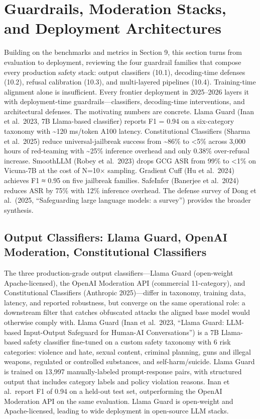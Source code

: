 \documentclass{article}
\begin{document}
\section{Guardrails, Moderation Stacks, and Deployment Architectures}\label{guardrails-moderation-stacks-and-deployment-architectures}

Building on the benchmarks and metrics in Section 9, this section turns from evaluation to deployment, reviewing the four guardrail families that compose every production safety stack: output classifiers (10.1), decoding-time defenses (10.2), refusal calibration (10.3), and multi-layered pipelines (10.4). Training-time alignment alone is insufficient. Every frontier deployment in 2025--2026 layers it with deployment-time guardrails---classifiers, decoding-time interventions, and architectural defenses. The motivating numbers are concrete. Llama Guard (Inan et al.~2023, 7B Llama-based classifier) reports F1 = 0.94 on a six-category taxonomy with \textasciitilde120 ms/token A100 latency. Constitutional Classifiers (Sharma et al.~2025) reduce universal-jailbreak success from \textasciitilde86\% to \textless5\% across 3,000 hours of red-teaming with \textasciitilde25\% inference overhead and only 0.38\% over-refusal increase. SmoothLLM (Robey et al.~2023) drops GCG ASR from 99\% to \textless1\% on Vicuna-7B at the cost of N=10× sampling. Gradient Cuff (Hu et al.~2024) achieves F1 ≈ 0.95 on five jailbreak families. SafeInfer (Banerjee et al.~2024) reduces ASR by 75\% with 12\% inference overhead. The defense survey of Dong et al.~(2025, ``Safeguarding large language models: a survey'') provides the broader synthesis.

\subsection{Output Classifiers: Llama Guard, OpenAI Moderation, Constitutional Classifiers}\label{output-classifiers-llama-guard-openai-moderation-constitutional-classifiers}

The three production-grade output classifiers---Llama Guard (open-weight Apache-licensed), the OpenAI Moderation API (commercial 11-category), and Constitutional Classifiers (Anthropic 2025)---differ in taxonomy, training data, latency, and reported robustness, but converge on the same operational role: a downstream filter that catches obfuscated attacks the aligned base model would otherwise comply with. Llama Guard (Inan et al.~2023, ``Llama Guard: LLM-based Input-Output Safeguard for Human-AI Conversations'') is a 7B Llama-based safety classifier fine-tuned on a custom safety taxonomy with 6 risk categories: violence and hate, sexual content, criminal planning, guns and illegal weapons, regulated or controlled substances, and self-harm/suicide. Llama Guard is trained on 13,997 manually-labeled prompt-response pairs, with structured output that includes category labels and policy violation reasons. Inan et al.~report F1 of 0.94 on a held-out test set, outperforming the OpenAI Moderation API on the same evaluation. Llama Guard is open-weight and Apache-licensed, leading to wide deployment in open-source LLM stacks.
\end{document}
